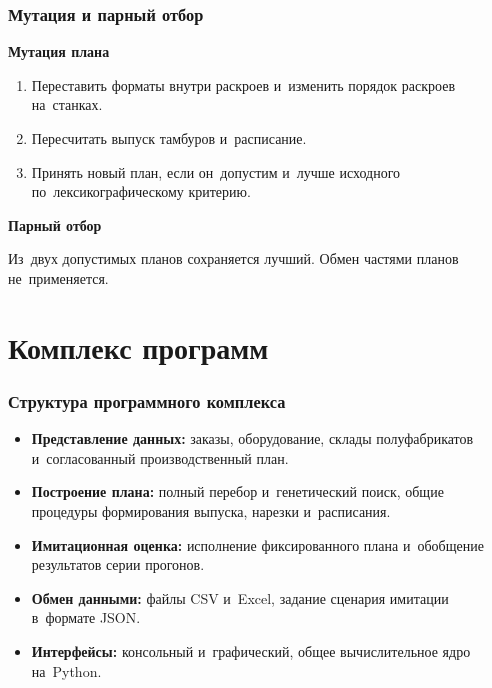 \begin{frame}
    \frametitle{Мутация и парный отбор}
    \large
    \textbf{Мутация плана}
    \begin{enumerate}
        \item Переставить форматы внутри раскроев и~изменить порядок раскроев на~станках.
        \item Пересчитать выпуск тамбуров и~расписание.
        \item Принять новый план, если он~допустим и~лучше исходного по~лексикографическому критерию.
    \end{enumerate}
    \vspace{0.3cm}
    \textbf{Парный отбор}

    Из~двух допустимых планов сохраняется лучший. Обмен частями планов не~применяется.
\end{frame}




\section{Комплекс программ}

\begin{frame}
    \frametitle{Структура программного комплекса}
    \begin{itemize}
        \item \textbf{Представление данных:} заказы, оборудование, склады полуфабрикатов и~согласованный производственный план.
        \item \textbf{Построение плана:} полный перебор и~генетический поиск, общие процедуры формирования выпуска, нарезки и~расписания.
        \item \textbf{Имитационная оценка:} исполнение фиксированного плана и~обобщение результатов серии прогонов.
        \item \textbf{Обмен данными:} файлы CSV и~Excel, задание сценария имитации в~формате JSON.
        \item \textbf{Интерфейсы:} консольный и~графический, общее вычислительное ядро на~Python.
    \end{itemize}
\end{frame}

